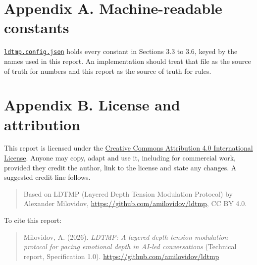 \documentclass[11pt]{article}
\begin{document}
\section{Appendix A. Machine-readable constants}

\href{ldtmp.config.json}{\texttt{ldtmp.config.json}} holds every
constant in Sections 3.3 to 3.6, keyed by the names used in this report.
An implementation should treat that file as the source of truth for
numbers and this report as the source of truth for rules.

\section{Appendix B. License and attribution}

This report is licensed under the \href{LICENSE}{Creative Commons
Attribution 4.0 International License}. Anyone may copy, adapt and use
it, including for commercial work, provided they credit the author, link
to the license and state any changes. A suggested credit line follows.

\begin{quote}
Based on LDTMP (Layered Depth Tension Modulation Protocol) by Alexander
Milovidov, \url{https://github.com/amilovidov/ldtmp}, CC BY 4.0.
\end{quote}

To cite this report:

\begin{quote}
Milovidov, A. (2026). \emph{LDTMP: A layered depth tension modulation
protocol for pacing emotional depth in AI-led conversations} (Technical
report, Specification 1.0). \url{https://github.com/amilovidov/ldtmp}
\end{quote}
\end{document}
